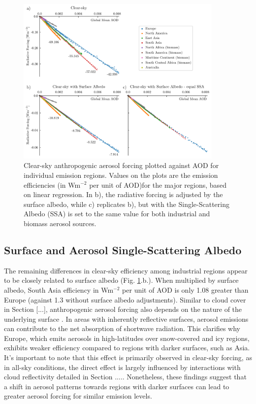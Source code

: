\documentclass[draft]{agujournal2019}
\begin{document}
      \begin{figure}
            \centering
            \includegraphics[width=0.9\textwidth]{../../figures/figure4}
            \caption{Clear-sky anthropogenic aerosol forcing plotted against AOD for individual emission regions. Values on the plots are the emission efficiencies (in Wm$^{-2}$ per unit of AOD)for the major regions, based on linear regression. In b), the radiative forcing is adjusted by the surface albedo, while c) replicates b), but with the Single-Scattering Albedo (SSA) is set to the same value for both industrial and biomass aerosol sources.}
            \label{fig:figure4}
      \end{figure}

      \subsection{Surface and Aerosol Single-Scattering Albedo}

            The remaining differences in clear-sky efficiency among industrial regions appear to be closely related to surface albedo (Fig. \ref{fig:figure4}.b.). When multiplied by surface albedo, South Asia efficiency in Wm$^{-2}$ per unit of AOD is only 1.08 greater than Europe (against 1.3 without surface albedo adjustments). Similar to cloud cover in Section [...], anthropogenic aerosol forcing also depends on the nature of the underlying surface \cite{Li_2022}. In areas with inherently reflective surfaces, aerosol emissions can contribute to the net absorption of shortwave radiation. This clarifies why Europe, which emits aerosols in high-latitudes over snow-covered and icy regions, exhibits weaker efficiency compared to regions with darker surfaces, such as Asia. It's important to note that this effect is primarily observed in clear-sky forcing, as in all-sky conditions, the direct effect is largely influenced by interactions with cloud reflectivity detailed in Section ..... Nonetheless, these findings suggest that a shift in aerosol patterns towards regions with darker surfaces can lead to greater aerosol forcing for similar emission levels.
            
\end{document}
